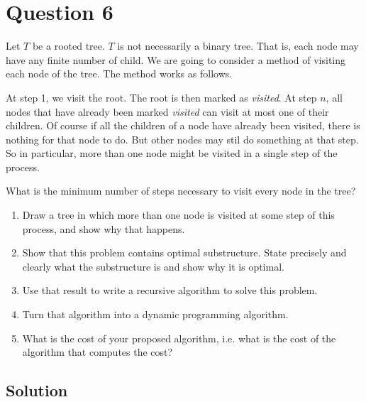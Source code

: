 
\section*{Question 6}
Let $T$ be a rooted tree. $T$ is not necessarily a binary tree. That is, each node may have any finite number of child. We are going to consider a method of visiting each node of the tree. The method works as follows.

At step 1, we visit the root. The root is then marked as \textit{visited}.
At step $n$, all nodes that have already been marked \textit{visited} can visit at most one of their children. Of course if all the children of a node have already been visited, there is nothing for that node to do. But other nodes may stil do something at that step. So in particular, more than one node might be visited in a single step of the process.

What is the minimum number of steps necessary to visit 
every node in the tree?

\begin{enumerate}[label=(\alph*)]
\item Draw a tree in which more than one node is visited at some step of this process, and show why that happens.

\item Show that this problem contains optimal substructure. State precisely and clearly what the substructure is and show why it is optimal.

\item Use that result to write a recursive algorithm to solve this problem.

\item Turn that algorithm into a dynamic programming algorithm.

\item What is the cost of your proposed algorithm, i.e. what is the cost of the algorithm that computes the cost?
\end{enumerate}

\subsection*{Solution}

